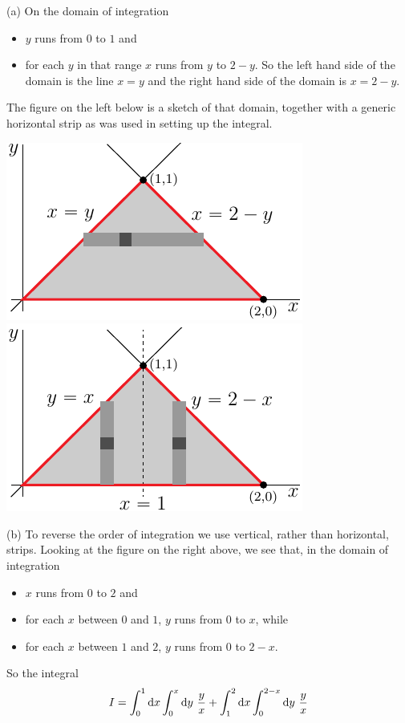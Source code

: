 \begin{solution}
(a) On the domain of integration
\begin{itemize}
\item
$y$ runs from $0$ to $1$ and
\item
for each $y$ in that range $x$ runs from $y$ to $2-y$.
So the left hand side of the domain is the line $x=y$ and 
the right hand side of the domain is $x=2-y$.
\end{itemize}
The figure on the left below is a sketch of that domain, together with 
a generic horizontal strip as was used in setting up the integral.

\begin{center}
     \includegraphics{fig/OE09D_6h.pdf}\qquad
     \includegraphics{fig/OE09D_6v.pdf}\qquad
\end{center}

(b) 
To reverse the order of integration we use vertical, rather than horizontal, strips. Looking at the figure on the right above, we see that, in the
domain of integration
\begin{itemize}
\item
$x$ runs from $0$ to $2$ and
\item
for each $x$ between $0$ and $1$, $y$ runs from $0$ to $x$, while
\item
for each $x$ between $1$ and $2$, $y$ runs from $0$ to $2-x$.
\end{itemize}
So the integral
\begin{align*}
I=\int_0^1\mathrm{d}x\int_0^x\mathrm{d}y\ \frac{y}{x}
  +\int_1^2\mathrm{d}x\int_0^{2-x}\mathrm{d}y\ \frac{y}{x} 
\end{align*}


\end{solution}
